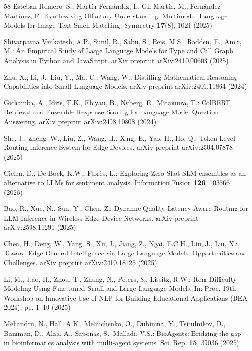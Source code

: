 \begin{thebibliography}{58}
Esteban-Romero, S., Martín-Fernández, I., Gil-Martín, M., Fernández-Martínez, F.: Synthesizing Olfactory Understanding: Multimodal Language Models for Image-Text Smell Matching. Symmetry \textbf{17}(8), 1021 (2025)

Shivarpatna Venkatesh, A.P., Sunil, R., Sabu, S., Reis, M.S., Bodden, E., Amir, M.: An Empirical Study of Large Language Models for Type and Call Graph Analysis in Python and JavaScript. arXiv preprint arXiv:2410.00603 (2025)

Zhu, X., Li, J., Liu, Y., Ma, C., Wang, W.: Distilling Mathematical Reasoning Capabilities into Small Language Models. arXiv preprint arXiv:2401.11864 (2024)

Gichamba, A., Idris, T.K., Ebiyau, B., Nyberg, E., Mitamura, T.: ColBERT Retrieval and Ensemble Response Scoring for Language Model Question Answering. arXiv preprint arXiv:2408.10808 (2024)

She, J., Zheng, W., Liu, Z., Wang, H., Xing, E., Yao, H., Ho, Q.: Token Level Routing Inference System for Edge Devices. arXiv preprint arXiv:2504.07878 (2025)

Cielen, D., De Bock, K.W., Florès, L.: Exploring Zero-Shot SLM ensembles as an alternative to LLMs for sentiment analysis. Information Fusion \textbf{126}, 103666 (2026)

Bao, R., Xue, N., Sun, Y., Chen, Z.: Dynamic Quality-Latency Aware Routing for LLM Inference in Wireless Edge-Device Networks. arXiv preprint arXiv:2508.11291 (2025)

Chen, H., Deng, W., Yang, S., Xu, J., Jiang, Z., Ngai, E.C.H., Liu, J., Liu, X.: Toward Edge General Intelligence via Large Language Models: Opportunities and Challenges. arXiv preprint arXiv:2410.18125 (2025)

Li, M., Jiao, H., Zhou, T., Zhang, N., Peters, S., Lissitz, R.W.: Item Difficulty Modeling Using Fine-tuned Small and Large Language Models. In: Proc. 19th Workshop on Innovative Use of NLP for Building Educational Applications (BEA 2024), pp. 1--10 (2025)

Mehandru, N., Hall, A.K., Melnichenko, O., Dubinina, Y., Tsirulnikov, D., Bamman, D., Alaa, A., Saponas, S., Malladi, V.S.: BioAgents: Bridging the gap in bioinformatics analysis with multi-agent systems. Sci. Rep. \textbf{15}, 39036 (2025)


\end{thebibliography}

